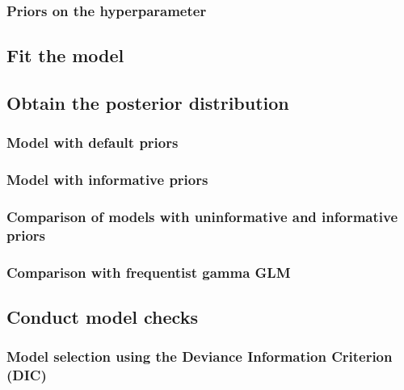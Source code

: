 \documentclass[
]{book}
\begin{document}
\hypertarget{gamma-hyper}{%
\subsubsection{Priors on the hyperparameter}\label{gamma-hyper}}

\hypertarget{gamma-fit-model}{%
\subsection{Fit the model}\label{gamma-fit-model}}

\hypertarget{gamma-post-dist}{%
\subsection{Obtain the posterior distribution}\label{gamma-post-dist}}

\hypertarget{gamma-def-priors}{%
\subsubsection{Model with default priors}\label{gamma-def-priors}}

\hypertarget{gamma-inf-priors}{%
\subsubsection{Model with informative priors}\label{gamma-inf-priors}}

\hypertarget{gamma-prior-comp}{%
\subsubsection{Comparison of models with uninformative and informative
priors}\label{gamma-prior-comp}}

\hypertarget{gamma-freq-comp}{%
\subsubsection{Comparison with frequentist gamma
GLM}\label{gamma-freq-comp}}

\hypertarget{conduct-model-checks-4}{%
\subsection{Conduct model checks}\label{conduct-model-checks-4}}

\hypertarget{gamma-dic}{%
\subsubsection{Model selection using the Deviance Information Criterion
(DIC)}\label{gamma-dic}}
\end{document}
